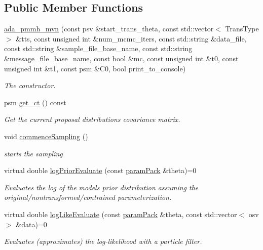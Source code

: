 \subsection*{Public Member Functions}
\begin{DoxyCompactItemize}
\item 
\hyperlink{classada__pmmh__mvn_ae3155f8b2994845d7f637279b04ce176}{ada\+\_\+pmmh\+\_\+mvn} (const psv \&start\+\_\+trans\+\_\+theta, const std\+::vector$<$ Trans\+Type $>$ \&tts, const unsigned int \&num\+\_\+mcmc\+\_\+iters, const std\+::string \&data\+\_\+file, const std\+::string \&sample\+\_\+file\+\_\+base\+\_\+name, const std\+::string \&message\+\_\+file\+\_\+base\+\_\+name, const bool \&mc, const unsigned int \&t0, const unsigned int \&t1, const psm \&C0, bool print\+\_\+to\+\_\+console)
\begin{DoxyCompactList}\small\item\em The constructor. \end{DoxyCompactList}\item 
psm \hyperlink{classada__pmmh__mvn_aaa1c6c2a6e2f775c217967135c8dd262}{get\+\_\+ct} () const
\begin{DoxyCompactList}\small\item\em Get the current proposal distribution\textquotesingle{}s covariance matrix. \end{DoxyCompactList}\item 
void \hyperlink{classada__pmmh__mvn_ab9fa416a913aeb6f6ea8189bfa23353f}{commence\+Sampling} ()
\begin{DoxyCompactList}\small\item\em starts the sampling \end{DoxyCompactList}\item 
virtual double \hyperlink{classada__pmmh__mvn_aff5af228ed4a7149287493e3ea6a5467}{log\+Prior\+Evaluate} (const \hyperlink{classparamPack}{param\+Pack} \&theta)=0
\begin{DoxyCompactList}\small\item\em Evaluates the log of the model\textquotesingle{}s prior distribution assuming the original/nontransformed/contrained parameterization. \end{DoxyCompactList}\item 
virtual double \hyperlink{classada__pmmh__mvn_ab2ebebd48c6cc1c35ec71f6f68529c61}{log\+Like\+Evaluate} (const \hyperlink{classparamPack}{param\+Pack} \&theta, const std\+::vector$<$ osv $>$ \&data)=0
\begin{DoxyCompactList}\small\item\em Evaluates (approximates) the log-\/likelihood with a particle filter. \end{DoxyCompactList}\end{DoxyCompactItemize}
